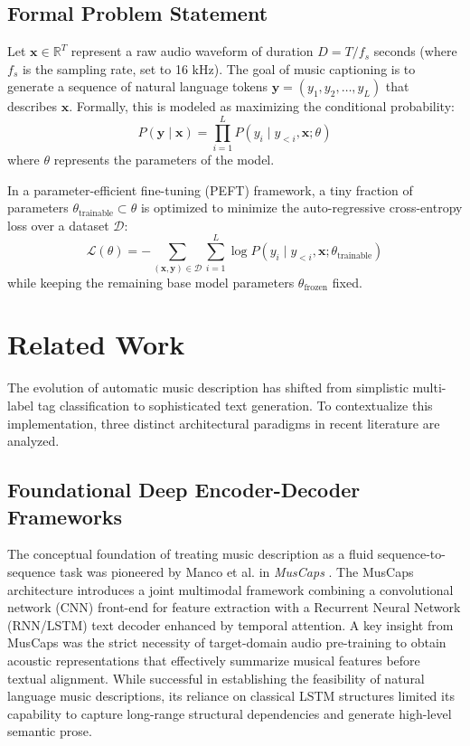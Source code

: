 \documentclass[12pt, conference, letterpaper]{IEEEtran}
\begin{document}
\subsection{Formal Problem Statement}
Let $\mathbf{x} \in \mathbb{R}^T$ represent a raw audio waveform of duration $D = T / f_s$ seconds (where $f_s$ is the sampling rate, set to 16 kHz). The goal of music captioning is to generate a sequence of natural language tokens $\mathbf{y} = (y_1, y_2, \dots, y_L)$ that describes $\mathbf{x}$. Formally, this is modeled as maximizing the conditional probability:
\begin{equation}
    P(\mathbf{y} \mid \mathbf{x}) = \prod_{i=1}^L P(y_i \mid y_{<i}, \mathbf{x}; \theta)
\end{equation}
where $\theta$ represents the parameters of the model.

In a parameter-efficient fine-tuning (PEFT) framework, a tiny fraction of parameters $\theta_{\text{trainable}} \subset \theta$ is optimized to minimize the auto-regressive cross-entropy loss over a dataset $\mathcal{D}$:
\begin{equation}
    \mathcal{L}(\theta) = -\sum_{(\mathbf{x}, \mathbf{y}) \in \mathcal{D}} \sum_{i=1}^L \log P(y_i \mid y_{<i}, \mathbf{x}; \theta_{\text{trainable}})
\end{equation}
while keeping the remaining base model parameters $\theta_{\text{frozen}}$ fixed.

\section{Related Work}
\label{sec:related_work}

The evolution of automatic music description has shifted from simplistic multi-label tag classification to sophisticated text generation. To contextualize this implementation, three distinct architectural paradigms in recent literature are analyzed.

\subsection{Foundational Deep Encoder-Decoder Frameworks}
The conceptual foundation of treating music description as a fluid sequence-to-sequence task was pioneered by Manco et al. in \textit{MusCaps} \cite{manco2021muscaps}. The MusCaps architecture introduces a joint multimodal framework combining a convolutional network (CNN) front-end for feature extraction with a Recurrent Neural Network (RNN/LSTM) text decoder enhanced by temporal attention. A key insight from MusCaps was the strict necessity of target-domain audio pre-training to obtain acoustic representations that effectively summarize musical features before textual alignment. While successful in establishing the feasibility of natural language music descriptions, its reliance on classical LSTM structures limited its capability to capture long-range structural dependencies and generate high-level semantic prose.
\end{document}
